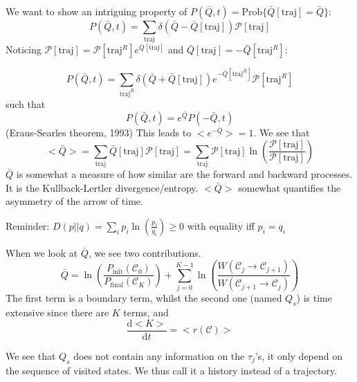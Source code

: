 \documentclass[a4paper]{book}
\theoremstyle{definition}
\theoremstyle{remark}
\begin{document}
We want to show an intriguing property of $P(\bar{Q}, t) = \text{Prob}\{\bar{Q}[\text{traj}] = \bar{Q}\}$:
\begin{equation}
    P(\bar{Q}, t) = \sum_{\text{traj}}\delta (\bar{Q} - \bar{Q}[\text{traj}])\mathscr{P}[\text{traj}]
\end{equation}
Noticing $\mathscr{P}[\text{traj}] = \mathscr{P}[\text{traj}^R]e^{\bar{Q}[\text{traj}]}$ and $\bar{Q}[\text{traj}] = -\bar{Q}[\text{traj}^R]$:

\begin{equation}
    P(\bar{Q}, t) = \sum_{\text{traj}^R} \delta(\bar{Q} + \bar{Q}[\text{traj}]) e^{-\bar{Q}[\text{traj}^R]}\mathscr{P}[\text{traj}^R]
\end{equation}
such that 
\begin{equation}
    P(\bar{Q}, t) = e^{\bar{Q}}P(-\bar{Q}, t)
\end{equation}
(Eraus-Searles theorem, 1993)\newline 
This leads to $<e^{-\bar{Q}}> = 1$. We see that 
\begin{equation}
    <\bar{Q}> = \sum_{\text{traj}} \bar{Q}[\text{traj}]\mathscr{P}[\text{traj}] = \sum_{\text{traj}} \mathscr{P}[\text{traj}] \ln\left(\frac{\mathscr{P}[\text{traj}]}{\mathscr{P}[\text{traj}]}\right)
\end{equation}
$\bar{Q}$ is somewhat a measure of how similar are the forward and backward processes. It is the Kullback-Lertler divergence/entropy. $<\bar{Q}>$ somewhat quantifies the asymmetry of the arrow of time. \par \medskip 
Reminder: $D(p || q) = \sum_i p_i \ln(\frac{p_i}{q_i}) \geq 0$ with equality iff $p_i = q_i$ \par \bigskip 

When we look at $\bar{Q}$, we see two contributions. 
\begin{equation}
    \bar{Q} = \ln\left(\frac{P_{\text{init}}(\mathscr{C}_0)}{P_{\text{final}}(\mathscr{C}_K)}\right) + \sum_{j=0}^{K-1} \ln\left(\frac{W(\mathscr{C}_j \rightarrow \mathscr{C}_{j+1})}{W(\mathscr{C}_{j+1} \rightarrow \mathscr{C}_j)}\right)
\end{equation}
The first term is a boundary term, whilst the second one (named $Q_s$) is time extensive since there are $K$ terms, and 
\begin{equation}
    \frac{\text{d}<K>}{\text{d}t} = <r(\mathscr{C})>
\end{equation}

We see that $Q_s$ does not contain any information on the $\tau_j$'s, it only depend on the sequence of visited states. We thus call it a history instead of a trajectory.
\end{document}
